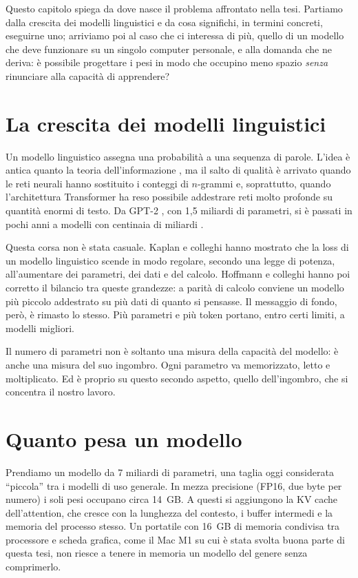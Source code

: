 Questo capitolo spiega da dove nasce il problema affrontato nella tesi. Partiamo dalla crescita dei modelli linguistici e da cosa significhi, in termini concreti, eseguirne uno; arriviamo poi al caso che ci interessa di più, quello di un modello che deve funzionare su un singolo computer personale, e alla domanda che ne deriva: è possibile progettare i pesi in modo che occupino meno spazio \emph{senza} rinunciare alla capacità di apprendere?

\section{La crescita dei modelli linguistici}

Un modello linguistico assegna una probabilità a una sequenza di parole. L'idea è antica quanto la teoria dell'informazione \cite{shannon1948mathematical}, ma il salto di qualità è arrivato quando le reti neurali hanno sostituito i conteggi di $n$-grammi \cite{bengio2003neural} e, soprattutto, quando l'architettura Transformer \cite{vaswani2017attention} ha reso possibile addestrare reti molto profonde su quantità enormi di testo. Da GPT-2 \cite{radford2019language}, con 1,5 miliardi di parametri, si è passati in pochi anni a modelli con centinaia di miliardi \cite{brown2020language}.

Questa corsa non è stata casuale. Kaplan e colleghi \cite{kaplan2020scaling} hanno mostrato che la loss di un modello linguistico scende in modo regolare, secondo una legge di potenza, all'aumentare dei parametri, dei dati e del calcolo. Hoffmann e colleghi \cite{hoffmann2022training} hanno poi corretto il bilancio tra queste grandezze: a parità di calcolo conviene un modello più piccolo addestrato su più dati di quanto si pensasse. Il messaggio di fondo, però, è rimasto lo stesso. Più parametri e più token portano, entro certi limiti, a modelli migliori.

Il numero di parametri non è soltanto una misura della capacità del modello: è anche una misura del suo ingombro. Ogni parametro va memorizzato, letto e moltiplicato. Ed è proprio su questo secondo aspetto, quello dell'ingombro, che si concentra il nostro lavoro.

\section{Quanto pesa un modello}

Prendiamo un modello da 7 miliardi di parametri, una taglia oggi considerata ``piccola'' tra i modelli di uso generale. In mezza precisione (FP16, due byte per numero) i soli pesi occupano circa 14~GB. A questi si aggiungono la KV cache dell'attention, che cresce con la lunghezza del contesto, i buffer intermedi e la memoria del processo stesso. Un portatile con 16~GB di memoria condivisa tra processore e scheda grafica, come il Mac M1 su cui è stata svolta buona parte di questa tesi, non riesce a tenere in memoria un modello del genere senza comprimerlo.

